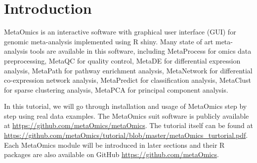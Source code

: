\section{Introduction}
 
MetaOmics is an interactive software with graphical user interface (GUI) for genomic meta-analysis implemented using R shiny.
Many state of art meta-analysis tools are available in this software,
including MetaProcess for omics data preprocessing, 
MetaQC for quality control, 
MetaDE for differential expression analysis,
MetaPath for pathway enrichment analysis,
MetaNetwork for differential co-expression network analysis,
MetaPredict for classification analysis,
MetaClust for sparse clustering analysis,
MetaPCA for principal component analysis.

In this tutorial, 
we will go through installation and usage of MetaOmics step by step using real data examples.
The MetaOmics suit software is publicly available at \url{https://github.com/metaOmics/metaOmics}.
The tutorial itself can be found at \url{https://github.com/metaOmics/tutorial/blob/master/metaOmics_turtorial.pdf}.
Each MetaOmics module will be introduced in later sections and their R packages are also available on GitHub \url{https://github.com/metaOmics}.


